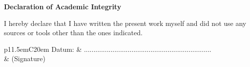 \documentclass[a4paper,11pt]{book} %
\begin{document}
	\frontmatter

	
	
	\mainmatter
	
	\renewcommand{\baselinestretch}{1.05}
	\small\normalsize

	
	
	
	
	

	\appendix
	
	
	




\newpage
\thispagestyle{empty}
\begin{center}
	\vspace*{5em}
	\huge\textbf{Declaration of Academic Integrity}\\
\end{center}
\vspace{2em}
I hereby declare that I have written the present work myself and did not use any sources
or tools other than the ones indicated.

\vspace{4em}
\begin{minipage}{\linewidth}
	\centering
	\begin{tabular}{p{11.5em}C{20em}}
		Datum: &  ...................................................................\\
		& \centering (Signature)\\
	\end{tabular}
\end{minipage}
\end{document}

